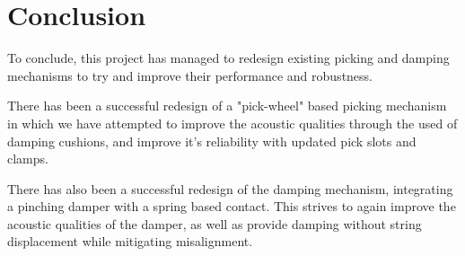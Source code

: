 \documentclass[a4paper,11pt]{article}
\begin{document}
\section{Conclusion}

To conclude, this project has managed to redesign existing picking and damping mechanisms to try and improve their performance and robustness. 

There has been a successful redesign of a "pick-wheel" based picking mechanism in which we have attempted to improve the acoustic qualities through the used of damping cushions, and improve it's reliability with updated pick slots and clamps. 

There has also been a successful redesign of the damping mechanism, integrating a pinching damper with a spring based contact. This strives to again improve the acoustic qualities of the damper, as well as provide damping without string displacement while mitigating misalignment. 

\newpage


\end{document}
